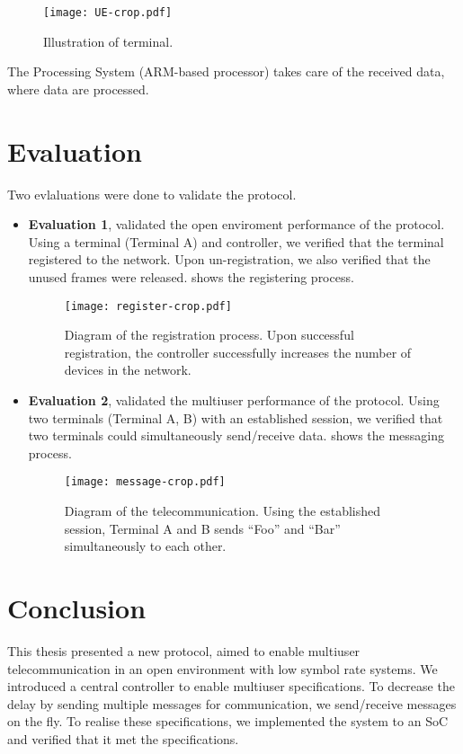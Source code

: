 ﻿\documentclass[twocolumn,9pt]{ltjsarticle}
\renewcommand{\ref}{\Cref}
\begin{document}
\begin{figure}[tb]
  \centering
  \texttt{[image: UE-crop.pdf]}
  \caption{\label{fig:terminal}
    Illustration of terminal.
  }
\end{figure}

The Processing System (ARM\textregistered -based processor) takes care of the received data, where data are processed.

\section{Evaluation}
Two evlaluations were done to validate the protocol.
\begin{itemize}
\item \textbf{Evaluation 1}, validated the open enviroment performance of the protocol.
  Using a terminal (Terminal A) and controller, we verified that the terminal registered to the network.
  Upon un-registration, we also verified that the unused frames were released.
  \ref{fig:register} shows the registering process.
  \begin{figure}[tb]
    \centering
    \texttt{[image: register-crop.pdf]}
    \caption{\label{fig:register}
      Diagram of the registration process.
      Upon successful registration, the controller successfully increases the number of devices in the network.
    }
  \end{figure}
\item \textbf{Evaluation 2}, validated the multiuser performance of the protocol.
  Using two terminals (Terminal A, B) with an established session, we verified that two terminals could simultaneously send/receive data.
  \ref{fig:message} shows the messaging process.
  
    \begin{figure}[tb]
    \centering
    \texttt{[image: message-crop.pdf]}
    \caption{\label{fig:message}
      Diagram of the telecommunication.
      Using the established session, Terminal A and B sends ``Foo'' and ``Bar'' simultaneously to each other.
    }
  \end{figure}
\end{itemize}

\section{Conclusion}
This thesis presented a new protocol, aimed to enable multiuser telecommunication in an open environment with low symbol rate systems.
We introduced a central controller to enable multiuser specifications.
To decrease the delay by sending multiple messages for communication, we send/receive messages on the fly.
To realise these specifications, we implemented the system to an SoC and verified that it met the specifications.
\end{document}

